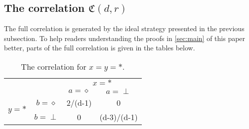 \documentclass[11pt,letterpaper]{article}
\newcommand{\1}{\mathbb{1}}
\newcommand{\fC}{\mathfrak{C}}
\theoremstyle{definition}
\begin{document}
\subsection{The correlation $\fC(d,r)$}
The full correlation is generated by the ideal strategy presented in the previous subsection.
To help readers understanding the proofs in \cref{sec:main} of this paper better, 
parts of the full correlation is given in the tables below.
\begin{table}[H]
\begin{center}
\begin{tabular}{|c|c||c|c|}
\hline
\multicolumn{2}{|c|}{} &
\multicolumn{2}{|c|}{$x=\ast$}\\
\cline{3-4}
\multicolumn{2}{|c|}{} &$a = \diamond$ & $a = \perp$ \\
\hline
\hline
\multirow{2}{*}{$y = \ast$} & $b=\diamond$ & 2/(d-1) & 0 \\
\cline{2-4}
&$b=\perp$ & 0 & (d-3)/(d-1) \\
\hline
\end{tabular}
\caption{The correlation for $x=y=\ast$.}
\end{center}
\end{table}
\end{document}
